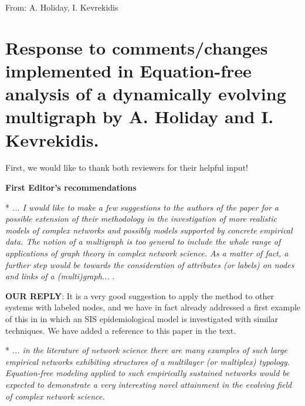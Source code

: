 \documentclass[12pt]{article}
\begin{document}
\begin{flushright}
From: A. Holiday, I. Kevrekidis
\end{flushright}

\vspace{5mm}


\vspace{2mm}

\section*{Response to comments/changes implemented in Equation-free analysis
of a dynamically evolving multigraph by A. Holiday and I. Kevrekidis.}

First, we would like to thank both reviewers for their helpful input!

\vspace{3mm}

\textbf{First Editor's recommendations}
\vspace*{\baselineskip}

* {\em ... I would like to make a few suggestions to the authors of
  the paper for a possible extension of their methodology in the
  investigation of more realistic models of complex networks and
  possibly models supported by concrete empirical data. The notion of
  a multigraph is too general to include the whole range of
  applications of graph theory in complex network science. As a matter
  of fact, a further step would be towards the consideration of
  attributes (or labels) on nodes and links of a (multi)graph... }.

\textbf{OUR REPLY}: It is a very good suggestion to apply the method
to other systems with labeled nodes, and we have in fact already
addressed a first example of this in \cite{kattis_modeling_2015} in which
an SIS epidemiological model is investigated with similar
techniques. We have added a reference to this paper in the text.
\vspace*{\baselineskip}

* {\em ... in the literature of network science there are many
  examples of such large empirical networks exhibiting structures of a
  multilayer (or multiplex) typology. Equation-free modeling applied
  to such empirically sustained networks would be expected to
  demonstrate a very interesting novel attainment in the evolving
  field of complex network science.}
\end{document}
